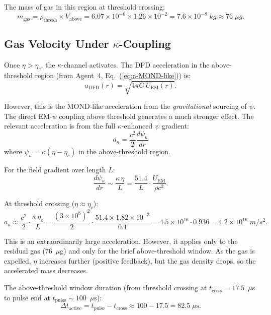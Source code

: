 \documentclass[amsmath,amssymb,aps,prd,superscriptaddress,nofootinbib]{revtex4-2}
\newcommand{\ka}{\kappa}
\newcommand{\etac}{\eta_c}
\begin{document}
The mass of gas in this region at threshold crossing:
\begin{equation}\label{eq:mass-residual}
m_\text{gas} = \rho_\text{thresh} \times V_\text{above}
= 6.07 \times 10^{-6} \times 1.26 \times 10^{-2}
= 7.6 \times 10^{-8} \; \si{kg}
\approx 76 \; \si{\mu g}.
\end{equation}

\subsection{Gas Velocity Under $\kappa$-Coupling}

Once $\eta > \etac$, the $\kappa$-channel activates. The
DFD acceleration in the above-threshold region (from Agent~4,
Eq.~(\ref*{eq:a-MOND-like})) is:
\begin{equation}
a_\text{DFD}(r) = \sqrt{4\pi G \, U_\text{EM}(r)}.
\end{equation}

However, this is the MOND-like acceleration from the \emph{gravitational}
sourcing of $\psi$. The direct EM-$\psi$ coupling above threshold
generates a much stronger effect. The relevant acceleration is from the
full $\kappa$-enhanced $\psi$ gradient:
\begin{equation}
a_\kappa = \frac{c^2}{2}\frac{d\psi_\kappa}{dr}
\end{equation}
where $\psi_\kappa = \ka(\eta - \etac)$ in the above-threshold region.

For the field gradient over length $L$:
\begin{equation}
\frac{d\psi_\kappa}{dr} \sim \frac{\ka \, \eta}{L}
= \frac{51.4}{L} \cdot \frac{U_\text{EM}}{\rho c^2}.
\end{equation}

At threshold crossing ($\eta \approx \etac$):
\begin{equation}
a_\kappa \approx \frac{c^2}{2} \cdot \frac{\ka \, \etac}{L}
= \frac{(3 \times 10^8)^2}{2} \cdot \frac{51.4 \times 1.82 \times 10^{-3}}{0.1}
= 4.5 \times 10^{16} \cdot 0.936
= 4.2 \times 10^{16} \; \si{m/s^2}.
\end{equation}

This is an extraordinarily large acceleration. However, it applies
only to the residual gas ($76$~$\mu$g) and only for the brief
above-threshold window. As the gas is expelled, $\eta$ increases
further (positive feedback), but the gas density drops, so the
accelerated mass decreases.

The above-threshold window duration (from threshold crossing at
$t_\text{cross} = 17.5$~$\mu$s to pulse end at $t_\text{pulse} \sim
100$~$\mu$s):
\begin{equation}
\Delta t_\text{active} = t_\text{pulse} - t_\text{cross}
\approx 100 - 17.5 = 82.5 \; \mu\text{s}.
\end{equation}
\end{document}
